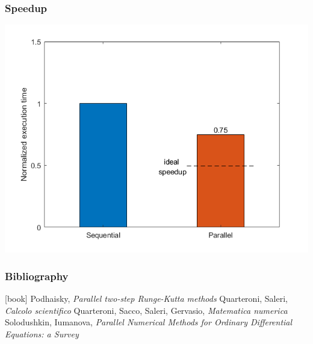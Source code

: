 \documentclass{beamer}
\begin{document}
\begin{frame} %
	\frametitle{Speedup}
	\begin{center}
		\includegraphics[width=0.8 \linewidth]{etc/test_8_speedup.png}
	\end{center}
\end{frame}


\begin{frame} %
	\frametitle{Bibliography}
	\begin{thebibliography}{9}
		 Podhaisky, \textit{Parallel two-step Runge-Kutta methods}
		 Quarteroni, Saleri, \textit{Calcolo scientifico}
		 Quarteroni, Sacco, Saleri, Gervasio, \textit{Matematica numerica}
		 Solodushkin, Iumanova, \textit{Parallel Numerical Methods for Ordinary Differential Equations: a Survey}	
	\end{thebibliography}
\end{frame}
\end{document}
